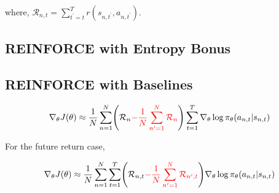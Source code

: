 \documentclass{article}
\begin{document}
where, $\mathcal{R}_{n, t} = \sum_{t^\prime=t}^T r(s_{n, t^\prime}, a_{n, t^\prime})$.


\subsection{REINFORCE with Entropy Bonus}
\subsection{REINFORCE with Baselines}

\begin{eqnarray}
\nabla_\theta J(\theta) 
\approx \frac{1}{N} \sum_{n=1}^{N} \Biggl(\mathcal{R}_n {\color{red}{- \frac{1}{N} \sum_{n^\prime=1}^N \mathcal{R}_n }} \Biggr)\sum_{t=1}^{T} \nabla_\theta \log \pi_\theta (a_{n, t}|s_{n, t}) 
\end{eqnarray}

For the future return case, 

\begin{eqnarray}
\nabla_\theta J(\theta) 
\approx \frac{1}{N} \sum_{n=1}^{N} \sum_{t=1}^{T} \Biggl(\mathcal{R}_{n, t} {\color{red}{- \frac{1}{N} \sum_{n^\prime=1}^N \mathcal{R}_{n^\prime, t} }} \Biggr)  \nabla_\theta \log \pi_\theta (a_{n, t}|s_{n, t}) 
\end{eqnarray}




\end{document}

